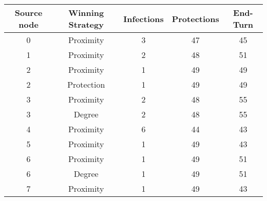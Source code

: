 \documentclass[results.tex]{subfiles}
\begin{document}
    \begin{center}
        \begin{tabular}{| c || c | c | c | c |}
            \hline
            {\bfseries Source node} & {\bfseries Winning Strategy} & {\bfseries Infections} & {\bfseries Protections}
            & {\bfseries End-Turn}
            \\  %
            \hline\hline
            0                       & Proximity                    & 3                      & 47                      & 45                   \\
            \hline
            1                       & Proximity                    & 2                      & 48                      & 51                   \\
            \hline
            2                       & Proximity                    & 1                      & 49                      & 49                   \\
            \hline
            2                       & Protection                   & 1                      & 49                      & 49                   \\
            \hline
            3                       & Proximity                    & 2                      & 48                      & 55                   \\
            \hline
            3                       & Degree                       & 2                      & 48                      & 55                   \\
            \hline
            4                       & Proximity                    & 6                      & 44                      & 43                   \\
            \hline
            5                       & Proximity                    & 1                      & 49                      & 43                   \\
            \hline
            6                       & Proximity                    & 1                      & 49                      & 51                   \\
            \hline
            6                       & Degree                       & 1                      & 49                      & 51                   \\
            \hline
            7                       & Proximity                    & 1                      & 49                      & 43                   \\

\end{tabular}
\end{center}
\end{document}
